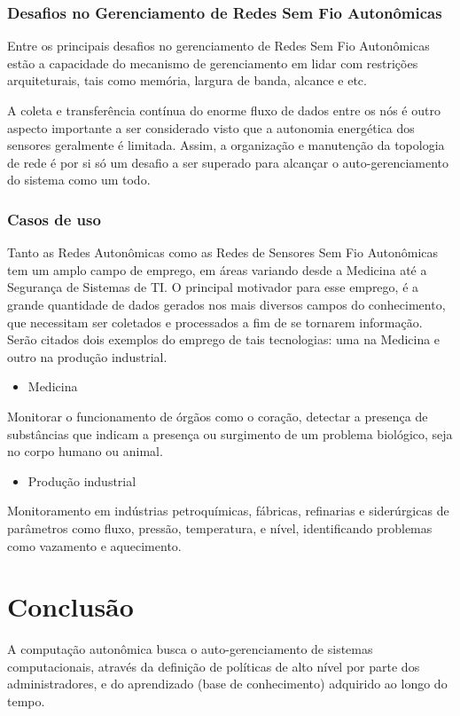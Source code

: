 \documentclass[11pt,twoside]{article}
\begin{document}
\subsubsection{Desafios no Gerenciamento de Redes Sem Fio Autonômicas}
Entre os principais desafios no gerenciamento de Redes Sem Fio Autonômicas estão a capacidade do mecanismo de gerenciamento em lidar com restrições arquiteturais, tais como memória, largura de banda, alcance e etc.

A coleta e transferência contínua do enorme fluxo de dados entre os nós é outro aspecto importante a ser considerado visto que a autonomia energética dos sensores geralmente é limitada.  Assim, a organização e manutenção da topologia de rede é por si só um desafio a ser superado para alcançar o auto-gerenciamento do sistema como um todo.

\subsubsection{Casos de uso}
Tanto as Redes Autonômicas como as Redes de Sensores Sem Fio Autonômicas tem um amplo campo de emprego, em áreas variando desde a Medicina até a Segurança de Sistemas de TI. O principal motivador para esse emprego, é a grande quantidade de dados gerados nos mais diversos campos do conhecimento, que necessitam ser coletados e processados a fim de se tornarem informação. Serão citados dois exemplos do emprego de tais tecnologias: uma na Medicina e outro na produção industrial.

\begin{itemize}
\item Medicina
\end{itemize}
Monitorar o funcionamento de órgãos como o coração, detectar a presença de substâncias que indicam a presença ou surgimento de um problema biológico, seja no corpo humano ou animal.

\begin{itemize}
\item Produção industrial
\end{itemize}
Monitoramento em indústrias petroquímicas, fábricas, refinarias e siderúrgicas de parâmetros como fluxo, pressão, temperatura, e nível, identificando problemas como vazamento e aquecimento.



\section{Conclusão}
A computação autonômica busca o auto-gerenciamento de sistemas computacionais, através da definição de políticas de alto nível por parte dos administradores, e do aprendizado (base de conhecimento) adquirido ao longo do tempo.
\end{document}
